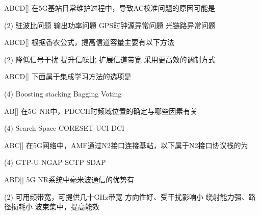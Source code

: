 \begin{choice}{\;ABCD\;}[]
    在5G基站日常维护过程中，导致AC校准问题的原因可能是
    \begin{tasks}(2)
        \task 驻波比问题
        \task 输出功率问题
        \task GPS时钟源异常问题
        \task 光链路异常问题
    \end{tasks}
\end{choice}


\begin{choice}{\;ABCD\;}[]
    根据香农公式，提高信道容量主要有以下方法

    \begin{tasks}(2)
        \task 降低信号干扰
        \task 提升信噪比
        \task 扩展信道带宽
        \task 采用更高效的调制方式
    \end{tasks}
\end{choice}

\begin{choice}{\;ABCD\;}[]
    下面属于集成学习方法的选项是
    \begin{tasks}(4)
        \task Boosting
        \task stacking
        \task Bagging
        \task Voting
    \end{tasks}
\end{choice}

\begin{choice}{\;AB\;}[]
    在5G NR中，PDCCH时频域位置的确定与哪些因素有关
    \begin{tasks}(4)
        \task Search Space
        \task CORESET
        \task UCI
        \task DCI
    \end{tasks}
\end{choice}

\begin{choice}{\;ABC\;}[]
    在5G网络中，AMF通过N2接口连接基站，以下属于N2接口协议栈的为
    \begin{tasks}(4)
        \task GTP-U
        \task NGAP
        \task SCTP
        \task SDAP
    \end{tasks}
\end{choice}

\begin{choice}{\;ABD\;}[]
    5G NR系统中毫米波通信的优势有
    \begin{tasks}(2)
        \task 可用频带宽，可提供几十GHz带宽
        \task 方向性好、受干扰影响小
        \task  绕射能力强、路径损耗小
        \task 波束集中，提高能效
    \end{tasks}
\end{choice}

